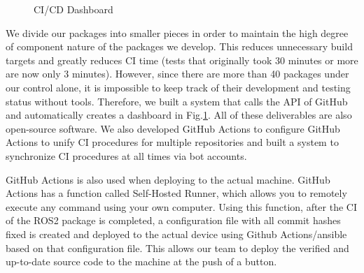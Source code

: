 \documentclass[lettersize,journal]{IEEEtran}
\begin{document}
\begin{figure}[H]
    \begin{center}
  \end{center}
  \caption{CI/CD Dashboard}
  \label{fig:ci_cd_dashboard}
\end{figure}

We divide our packages into smaller pieces in order to maintain the high degree of component nature of the packages we develop.
This reduces unnecessary build targets and greatly reduces CI time (tests that originally took 30 minutes or more are now only 3 minutes).
However, since there are more than 40 packages under our control alone,
it is impossible to keep track of their development and testing status without tools.
Therefore, we built a system that calls the API of GitHub and automatically creates a dashboard in Fig.\ref{fig:ci_cd_dashboard}.
All of these deliverables are also open-source software.
We also developed GitHub Actions to configure GitHub Actions to unify CI procedures for multiple repositories and
built a system to synchronize CI procedures at all times via bot accounts. \cite{wam-v-tan_bot}

GitHub Actions is also used when deploying to the actual machine.
GitHub Actions has a function called Self-Hosted Runner, which allows you to remotely execute any command using your own computer.
Using this function, after the CI of the ROS2 package is completed, 
a configuration file with all commit hashes fixed is created and deployed to the actual device
using Github Actions/ansible based on that configuration file.
This allows our team to deploy the verified and up-to-date source code to the machine at the push of a button.
\end{document}
